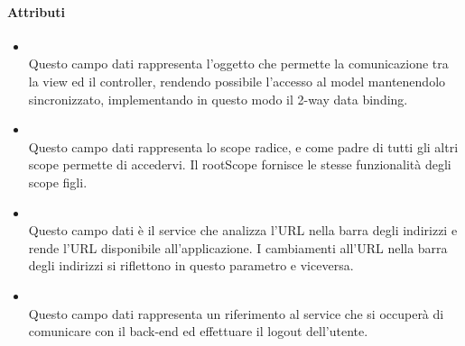 \paragraph*{Attributi}
\begin{itemize}
\item[]  \\ Questo campo dati rappresenta l'oggetto che permette la comunicazione tra la view ed il controller, rendendo possibile l’accesso al model mantenendolo sincronizzato, implementando in questo modo il 2-way data binding.
\item[]  \\ Questo campo dati rappresenta lo scope radice, e come padre di tutti gli altri scope permette di accedervi. Il rootScope fornisce le stesse funzionalità degli scope figli.
\item[]  \\ Questo campo dati è il service che analizza l'URL nella barra degli indirizzi e rende l'URL disponibile all'applicazione. I cambiamenti all'URL nella barra degli indirizzi si riflettono in questo parametro e viceversa.
\item[]  \\ Questo campo dati rappresenta un riferimento al service che si occuperà di comunicare con il back-end ed effettuare il logout dell'utente.
\end{itemize}

